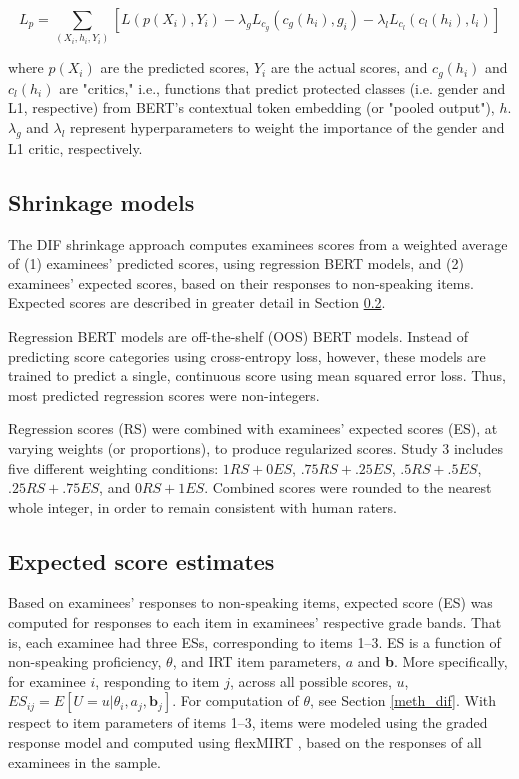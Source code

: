 \documentclass [PhD] {uclathes}
\begin{document}
$$
L_p = \sum_{(X_i, h_i, Y_i)} [L(p(X_i), Y_i) - \lambda_g L_{c_g}(c_g(h_i), g_i) - \lambda_l L_{c_l}(c_l(h_i), l_i)] 
$$

where $p(X_i)$ are the predicted scores, $Y_i$ are the actual scores, and $c_g(h_i)$ and $c_l(h_i)$ are "critics," i.e., functions that predict protected classes (i.e. gender and L1, respective) from BERT’s contextual token embedding (or "pooled output"), $h$. $\lambda_g$ and $\lambda_l$ represent hyperparameters to weight the importance of the gender and L1 critic, respectively. 

\subsection{Shrinkage models}

The DIF shrinkage approach computes examinees scores from a weighted average of (1) examinees’ predicted scores, using regression BERT models, and (2) examinees' expected scores, based on their responses to non-speaking items. Expected scores are described in greater detail in Section \ref{sec:meth_es}. 

Regression BERT models are off-the-shelf (OOS) BERT models. Instead of predicting score categories using cross-entropy loss, however, these models are trained to predict a single, continuous score using mean squared error loss. Thus, most predicted regression scores were non-integers. 

Regression scores (RS) were combined with examinees’ expected scores (ES), at varying weights (or proportions), to produce regularized scores. Study 3 includes five different weighting conditions: $1 RS + 0 ES$, $.75 RS + .25 ES$, $.5 RS + .5 ES$, $.25 RS + .75 ES$, and $0 RS + 1 ES$. Combined scores were rounded to the nearest whole integer, in order to remain consistent with human raters. 

\subsection{Expected score estimates}
\label{sec:meth_es}

Based on examinees’ responses to non-speaking items, expected score (ES) was computed for responses to each item in examinees’ respective grade bands. That is, each examinee had three ESs, corresponding to items 1–3. ES is a function of non-speaking proficiency, $\theta$, and IRT item parameters, $a$ and \textbf{b}. More specifically, for examinee $i$, responding to item $j$, across all possible scores, $u$, $ES_{ij} = E[U=u|\theta_i, a_j, \textbf{b}_j]$. For computation of $\theta$, see Section \ref{meth_dif}. With respect to item parameters of items 1–3, items were modeled using the graded response model \citep{samejima1997graded} and computed using flexMIRT \citep{cai2012flexmirt}, based on the responses of all examinees in the sample. 
\end{document}
